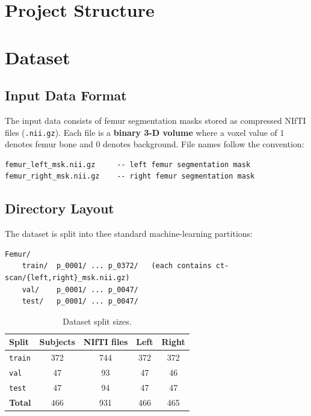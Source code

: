 \documentclass[12pt,a4paper]{article}
\begin{document}
\section{Project Structure}

\section{Dataset}

\subsection{Input Data Format}

The input data consists of femur segmentation masks stored as compressed NIfTI
files (\texttt{.nii.gz}).  Each file is a \textbf{binary 3-D volume} where
a voxel value of $1$ denotes femur bone and $0$ denotes background.
File names follow the convention:

\begin{lstlisting}[language={},basicstyle=\ttfamily\small,frame=single,numbers=none]
femur_left_msk.nii.gz     -- left femur segmentation mask
femur_right_msk.nii.gz    -- right femur segmentation mask
\end{lstlisting}

\subsection{Directory Layout}

The dataset is split into thee standard machine-learning partitions:

\begin{lstlisting}[language={},basicstyle=\ttfamily\small,frame=single,numbers=none]
Femur/
    train/  p_0001/ ... p_0372/   (each contains ct-scan/{left,right}_msk.nii.gz)
    val/    p_0001/ ... p_0047/
    test/   p_0001/ ... p_0047/
\end{lstlisting}

\begin{table}[H]
\centering
\caption{Dataset split sizes.}
\label{tab:splits}
\begin{tabular}{@{}lcccc@{}}
\toprule
\textbf{Split} & \textbf{Subjects} & \textbf{NIfTI files} & \textbf{Left} & \textbf{Right} \\
\midrule
\texttt{train} & 372 & 744 & 372 & 372 \\
\texttt{val}   &  47 &  93 &  47 &  46 \\
\texttt{test}  &  47 &  94 &  47 &  47 \\
\midrule
\textbf{Total} & 466 & 931 & 466 & 465 \\
\bottomrule
\end{tabular}
\end{table}
\end{document}
